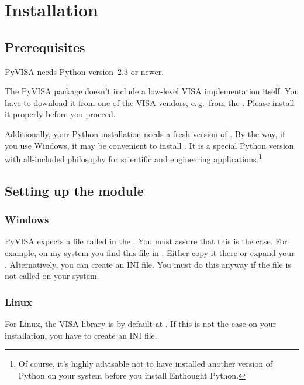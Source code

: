 \documentclass{howto}
\begin{document}
\section{Installation}

\subsection{Prerequisites}

PyVISA needs Python version~2.3 or newer.

The PyVISA package doesn't include a low-level VISA implementation itself.  You
have to download it from one of the VISA vendors, e.\,g.\ from the
.  Please install
it properly before you proceed.

Additionally, your Python installation needs a fresh version of
.  By the way,
if you use Windows, it may be convenient to install .  It is a special Python version
with all-included philosophy for scientific and engineering
applications.\footnote{Of course, it's highly advisable not to have installed
  another version of Python on your system before you install Enthought
  Python.}


\subsection{Setting up the module}

\subsubsection{Windows}

PyVISA expects a file called  in the \@.  You
must assure that this is the case.  For example, on my system you find this
file in .  Either copy it there or expand your
.  Alternatively, you can create an INI file.  You must do this
anyway if the file is not called  on your system.


\subsubsection{Linux}

For Linux, the VISA library is by default at
.  If this is not the case on
your installation, you have to create an INI file.
\end{document}
